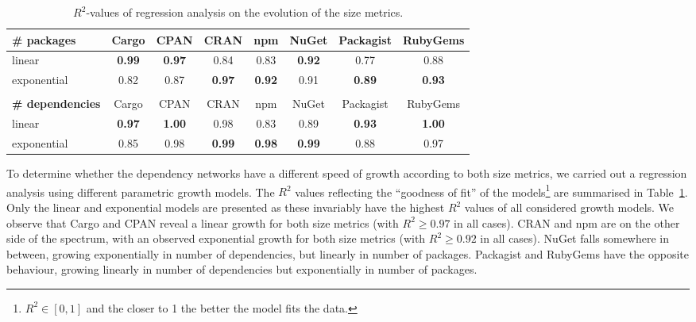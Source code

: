 \documentclass[smallextended]{svjour3}       %
\newcommand{\tab}[1]{Table~\ref{#1}}
\newcommand{\cran}{\textsf{CRAN}\xspace}
\newcommand{\cpan}{\textsf{CPAN}\xspace}
\newcommand{\rubygems}{\textsf{RubyGems}\xspace}
\newcommand{\packagist}{\textsf{Packagist}\xspace}
\newcommand{\cargo}{\textsf{Cargo}\xspace}
\newcommand{\nuget}{\textsf{NuGet}\xspace}
\newcommand{\npm}{\textsf{npm}\xspace}
\begin{document}
\begin{table}[!htbp]
\caption{$R^2$-values of regression analysis on the evolution of the size metrics.}
\label{tab:growth_regressions}\centering
\begin{tabular}{l||c|c|c|c|c|c|c}
 \bf \# packages & \cargo & \cpan & \cran & \npm & \nuget & \packagist & \rubygems\\
  \hline%
 linear & \bf 0.99 & \bf 0.97 & 0.84 & 0.83 & \bf 0.92 & 0.77 & 0.88 \\ %
 exponential & 0.82 & 0.87 & \bf 0.97 & \bf 0.92 & 0.91 & \bf 0.89 & \bf 0.93 \\
 \multicolumn{1}{l}{} & \multicolumn{1}{l}{} & \multicolumn{1}{l}{} & \multicolumn{1}{l}{} & \multicolumn{1}{l}{} & \multicolumn{1}{l}{} & \multicolumn{1}{l}{} & \multicolumn{1}{l}{} \\
 

 \bf \# dependencies & \cargo & \cpan & \cran & \npm & \nuget & \packagist & \rubygems\\ 
 \hline%
 linear & \bf 0.97 & \bf 1.00 & 0.98 & 0.83 & 0.89 & \bf 0.93 & \bf 1.00 \\ %
 exponential & 0.85 & 0.98 & \bf 0.99 & \bf 0.98 & \bf 0.99 & 0.88 & 0.97 \\
\end{tabular}
\end{table}

To determine whether the dependency networks have a different speed of growth according to both size metrics, we carried out a regression analysis using different parametric growth models. The $R^2$ values reflecting the ``goodness of fit'' of the models\footnote{$R^2\in[0,1]$ and the closer to 1 the better the model fits the data.} are summarised in \tab{tab:growth_regressions}. Only the linear and exponential models are presented as these invariably have the highest $R^2$ values of all considered growth models.
We observe that \cargo and \cpan reveal a linear growth for both size metrics (with $R^2\geq 0.97$ in all cases). \cran and \npm are on the other side of the spectrum, with an observed exponential growth  for both size metrics (with $R^2\geq 0.92$ in all cases). \nuget falls somewhere in between, growing exponentially in number of dependencies, but linearly in number of packages. \packagist and \rubygems have the opposite behaviour, growing linearly in number of dependencies but exponentially in number of packages.
\end{document}
